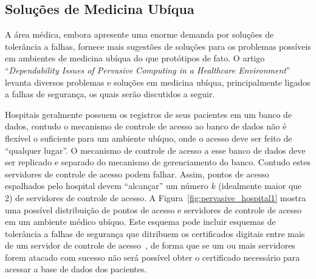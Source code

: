 
% 


\subsection{Soluções de Medicina Ubíqua} %

A área médica, embora apresente uma enorme demanda por soluções de tolerância a falhas, fornece mais sugestões de soluções para os problemas possíveis em ambientes de medicina ubíqua do que protótipos de fato. O artigo ``\emph{Dependability Issues of Pervasive Computing in a Healthcare Environment}''~\cite{bohn2004dependability} levanta diversos problemas e soluções em medicina ubíqua, principalmente ligados a falhas de segurança, os quais serão discutidos a seguir.

Hospitais geralmente possuem os registros de seus pacientes em um banco de dados, contudo o mecanismo de controle de acesso ao banco de dados não é flexível o suficiente para um ambiente ubíquo, onde o acesso deve ser feito de ``qualquer lugar''. O mecanismo de controle de acesso a esse banco de dados deve ser replicado e separado do mecanismo de gerenciamento do banco. Contudo estes servidores de controle de acesso podem falhar. Assim, pontos de acesso espalhados pelo hospital devem ``alcançar'' um número $k$ (idealmente maior que 2) de servidores de controle de acesso. A Figura~\ref{fig:pervasive_hospital1} mostra uma possível distribuição de pontos de acesso e servidores de controle de acesso em um ambiente médico ubíquo. Este esquema pode incluir esquemas de tolerância a falhas de segurança que ditribuem os certificados digitais entre mais de um servidor de controle de acesso~\cite{rabin1989efficient}, de forma que se um ou mais servidores forem atacado com sucesso não será possível obter o certificado necessário para acessar a base de dados dos pacientes.

